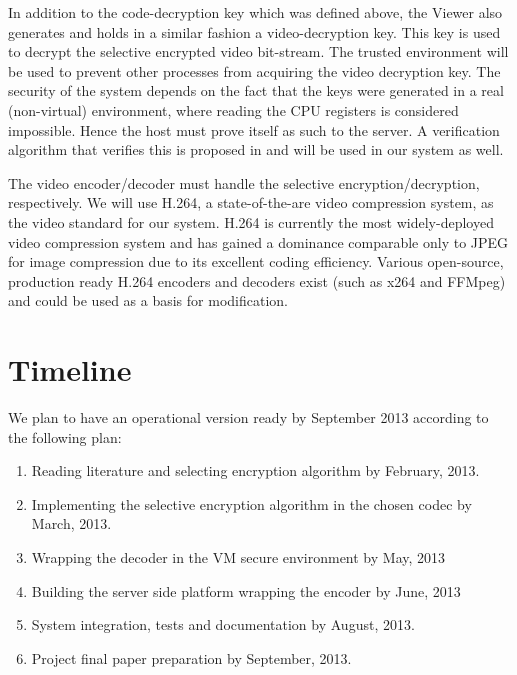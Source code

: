 \documentclass[conference]{IEEEtran}
\begin{document}
In addition to the code-decryption key which was defined above, the
Viewer also generates and holds in a similar fashion a video-decryption
key. This key is used to decrypt the selective encrypted video
bit-stream. The trusted environment will be used to prevent other
processes from acquiring the video decryption key. The security of
the system depends on the fact that the keys were generated in a real
(non-virtual) environment, where reading the CPU registers is considered
impossible. Hence the host must prove itself as such to the server. A
verification algorithm that verifies this is proposed in \cite{4} and
will be used in our system as well.

The video encoder/decoder must handle the selective
encryption/decryption, respectively. We will use H.264, a
state-of-the-are video compression system, as the video standard for our
system. H.264 is currently the most widely-deployed video compression
system and has gained a dominance comparable only to JPEG for image
compression due to its excellent coding efficiency. Various open-source,
production ready H.264 encoders and decoders exist (such as x264\cite{5}
and FFMpeg\cite{6}) and could be used as a basis for modification.

\section{Timeline} 
We plan to have an operational version ready by September 2013 according to the following plan:
\begin{enumerate} 
    \item Reading literature and selecting encryption algorithm by February, 2013. 
    \item Implementing the selective encryption algorithm in the chosen codec by March, 2013.
    \item Wrapping the decoder in the VM secure environment by May, 2013
    \item Building the server side platform wrapping the encoder by June, 2013
    \item System integration, tests and documentation by August, 2013.
    \item Project final paper preparation by September, 2013. 
\end{enumerate}
\end{document}
